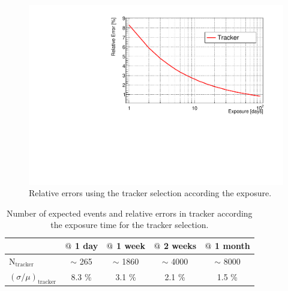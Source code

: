 \documentclass[main.tex]{subfiles}
\begin{document}
\begin{figure}[h!]
\begin{center}
\includegraphics[scale=0.5]{pictures/Chap5/rr.pdf}
\caption{Relative errors using the tracker selection according the exposure.}
\label{picture_relative_error_tracker_selection}
\end{center}
\end{figure}


\begin{table}[h!]
\begin{center}
\begin{tabular}{l|c|c|c|c}
      & $\symbol{64}~$1 day  & $\symbol{64}~$1 week  & $\symbol{64}~$2 weeks & $\symbol{64}~$1 month  \\
\hline
$\text{N}_\text{tracker}$         & $\sim$ 265 & $\sim$ 1860 & $\sim$ 4000 & $\sim$ 8000 \\ 
$(\sigma / \mu)_{\text{tracker}}$ & 8.3 \%     & 3.1  \%     & 2.1  \%     & 1.5  \% \\
\hline
\end{tabular}
\end{center}
\caption{Number of expected events and relative errors in tracker according the exposure time for the tracker selection.}
\label{table_number_of_expected_events_relative_error_tracker_selection}
\end{table}


\bigskip
\FloatBarrier


\end{document}
